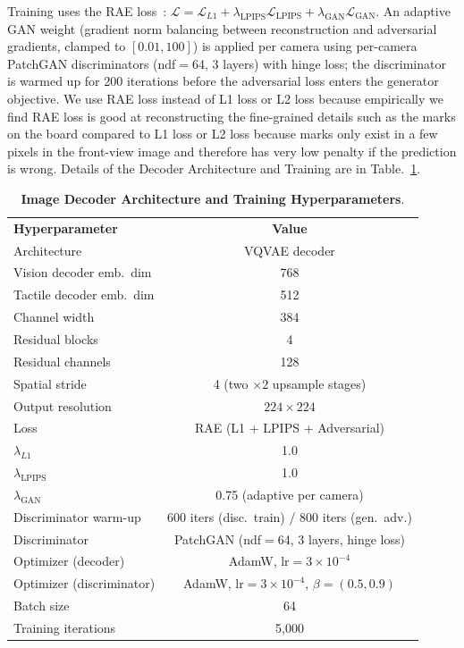   Training uses the RAE loss~\cite{zheng2025diffusion}: $\mathcal{L} = \mathcal{L}_{L1} + \lambda_{\text{LPIPS}}
  \mathcal{L}_{\text{LPIPS}} + \lambda_{\text{GAN}} \mathcal{L}_{\text{GAN}}$.
  An adaptive GAN weight (gradient norm balancing between reconstruction and adversarial gradients,
  clamped to $[0.01, 100]$) is applied per camera using per-camera PatchGAN discriminators
  (ndf$=$64, 3 layers) with hinge loss; the discriminator is warmed up for 200 iterations before
  the adversarial loss enters the generator objective. We use RAE loss instead of L1 loss or L2 loss because empirically we find RAE loss is good at reconstructing the fine-grained details such as the marks on the board compared to L1 loss or L2 loss because marks only exist in a few pixels in the front-view image and therefore has very low penalty if the prediction is wrong. Details of the Decoder Architecture and Training are in Table.~\ref{tab:decoder_training}.

  \begin{table}[h]
  \centering
  \caption{\textbf{Image Decoder Architecture and Training Hyperparameters}.}
  \label{tab:decoder}
  \begin{tabular}{lc}
  \toprule
  \textbf{Hyperparameter} & \textbf{Value} \\
  Architecture            & VQVAE decoder  \\
  Vision decoder emb.\ dim & 768 \\
  Tactile decoder emb.\ dim & 512 \\
  Channel width           & 384 \\
  Residual blocks         & 4 \\
  Residual channels       & 128 \\
  Spatial stride          & 4 (two ${\times}2$ upsample stages) \\
  Output resolution       & $224{\times}224$ \\
  \midrule
  Loss                    & RAE (L1 + LPIPS + Adversarial) \\
  $\lambda_{L1}$          & 1.0 \\
  $\lambda_{\text{LPIPS}}$ & 1.0 \\
  $\lambda_{\text{GAN}}$  & 0.75 (adaptive per camera) \\
  Discriminator warm-up   & 600 iters (disc.\ train) / 800 iters (gen.\ adv.) \\
  Discriminator           & PatchGAN (ndf$=$64, 3 layers, hinge loss) \\
  Optimizer (decoder)     & AdamW, lr$=3{\times}10^{-4}$ \\
  Optimizer (discriminator) & AdamW, lr$=3{\times}10^{-4}$, $\beta=(0.5, 0.9)$ \\
  Batch size              & 64 \\
  Training iterations     & 5{,}000 \\
  \bottomrule
  \end{tabular}
  \label{tab:decoder_training}
  \end{table}


